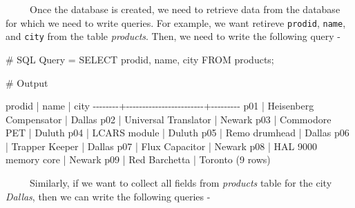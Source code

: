 \documentclass[
  letterpaper,
  DIV=11,
  numbers=noendperiod]{scrreprt}
\newenvironment{Shaded}{\begin{snugshade}}{\end{snugshade}}
\newcommand{\CommentTok}[1]{\textcolor[rgb]{0.37,0.37,0.37}{#1}}
\newcommand{\DecValTok}[1]{\textcolor[rgb]{0.68,0.00,0.00}{#1}}
\newcommand{\NormalTok}[1]{\textcolor[rgb]{0.00,0.23,0.31}{#1}}
\newcommand{\SpecialCharTok}[1]{\textcolor[rgb]{0.37,0.37,0.37}{#1}}
\begin{document}
~~~~~Once the database is created, we need to retrieve data from the
database for which we need to write queries. For example, we want
retireve \texttt{prodid}, \texttt{name}, and \texttt{city} from the
table \emph{products}. Then, we need to write the following query -

\begin{Shaded}
\begin{Highlighting}[]
\CommentTok{\# SQL Query = }
\NormalTok{SELECT prodid, name, city FROM products;}

\CommentTok{\# Output }

\NormalTok{ prodid }\SpecialCharTok{|}\NormalTok{          name          }\SpecialCharTok{|}\NormalTok{  city}
\SpecialCharTok{{-}{-}{-}{-}{-}{-}{-}{-}+{-}{-}{-}{-}{-}{-}{-}{-}{-}{-}{-}{-}{-}{-}{-}{-}{-}{-}{-}{-}{-}{-}{-}{-}+{-}{-}{-}{-}{-}{-}{-}{-}{-}}
\NormalTok{ p01    }\SpecialCharTok{|}\NormalTok{ Heisenberg Compensator }\SpecialCharTok{|}\NormalTok{ Dallas}
\NormalTok{ p02    }\SpecialCharTok{|}\NormalTok{ Universal Translator   }\SpecialCharTok{|}\NormalTok{ Newark}
\NormalTok{ p03    }\SpecialCharTok{|}\NormalTok{ Commodore PET          }\SpecialCharTok{|}\NormalTok{ Duluth}
\NormalTok{ p04    }\SpecialCharTok{|}\NormalTok{ LCARS module           }\SpecialCharTok{|}\NormalTok{ Duluth}
\NormalTok{ p05    }\SpecialCharTok{|}\NormalTok{ Remo drumhead          }\SpecialCharTok{|}\NormalTok{ Dallas}
\NormalTok{ p06    }\SpecialCharTok{|}\NormalTok{ Trapper Keeper         }\SpecialCharTok{|}\NormalTok{ Dallas}
\NormalTok{ p07    }\SpecialCharTok{|}\NormalTok{ Flux Capacitor         }\SpecialCharTok{|}\NormalTok{ Newark}
\NormalTok{ p08    }\SpecialCharTok{|}\NormalTok{ HAL }\DecValTok{9000}\NormalTok{ memory core   }\SpecialCharTok{|}\NormalTok{ Newark}
\NormalTok{ p09    }\SpecialCharTok{|}\NormalTok{ Red Barchetta          }\SpecialCharTok{|}\NormalTok{ Toronto}
\NormalTok{(}\DecValTok{9}\NormalTok{ rows)}
\end{Highlighting}
\end{Shaded}

~~~~~Similarly, if we want to collect all fields from \emph{products}
table for the city \emph{Dallas}, then we can write the following
queries -
\end{document}
